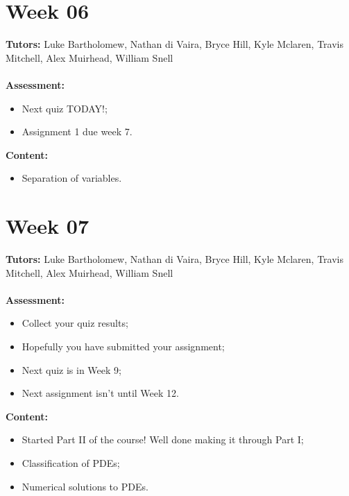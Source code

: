 \documentclass[11pt,a4paper]{report}
\begin{document}
		\begingroup
	\makeatletter
	\let\clearpage\relax
	\vspace*{\fill}%
	\vspace*{\dimexpr-50\p@-\baselineskip}
	\chapter*{Week 06}
	\textbf{Tutors:} Luke Bartholomew, Nathan di Vaira, Bryce Hill, Kyle Mclaren, Travis Mitchell, Alex Muirhead, William Snell \\\\
	\textbf{Assessment:} 
	\begin{itemize}
		\item Next quiz TODAY!;
		\item Assignment 1 due week 7.
	\end{itemize}	
	\textbf{Content:}
	\begin{itemize}
		\item Separation of variables.
	\end{itemize}
	\vspace*{\fill}
	\endgroup
	
	
	
	\begingroup
	\makeatletter
	\let\clearpage\relax
	\vspace*{\fill}%
	\vspace*{\dimexpr-50\p@-\baselineskip}
	\chapter*{Week 07}
	\textbf{Tutors:} Luke Bartholomew, Nathan di Vaira, Bryce Hill, Kyle Mclaren, Travis Mitchell, Alex Muirhead, William Snell \\\\
	\textbf{Assessment:} 
	\begin{itemize}
		\item Collect your quiz results;
		\item Hopefully you have submitted your assignment;
		\item Next quiz is in Week 9;
		\item Next assignment isn't until Week 12. 
	\end{itemize}	
	\textbf{Content:}
	\begin{itemize}
		\item Started Part II of the course! Well done making it through Part I;
		\item Classification of PDEs;
		\item Numerical solutions to PDEs.
	\end{itemize}
	\vspace*{\fill}
	\endgroup
	
	
\end{document}
